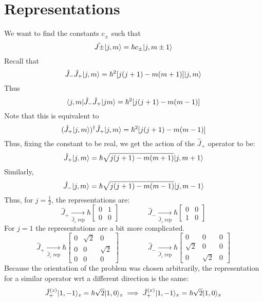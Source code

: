 \section{Representations}
We want to find the constants \(c_\pm\) such that
\[\hat{J\pm} \lvert j,m\rangle=\hbar c_\pm\lvert j,m\pm1\rangle\]
Recall that 
\[\hat J_-\hat J_+ \lvert j,m\rangle= \hbar^2 [j(j+1)-m(m+1)]\lvert j,m\rangle\]
Thus
\[\langle j,m\rvert\hat{J}_-\hat J_+\lvert jm\rangle=\hbar^2[j(j+1)-m(m-1)]\]
Note that this is equivalent to
\[(\hat J_+\lvert j,m\rangle)^{\dagger}\hat{J}_+\lvert j,m\rangle=\hbar^2[j(j+1)-m(m-1)]\]
Thus, fixing the constant to be real, we get the action of the \(\hat{J}_+\) operator to be:
\begin{equation}
	\hat{J}_+\lvert j,m\rangle = \hbar\sqrt{j(j+1)-m(m+1)}\lvert j,m+1\rangle
\end{equation}
Similarly,
\begin{equation}
	\hat{J}_-\lvert j,m\rangle = \hbar\sqrt{j(j+1)-m(m-1)}\lvert j,m-1\rangle
\end{equation}
Thus, for \(j=\frac{1}{2}\), the representations are:
\begin{equation}
	\hat J_+ \xrightarrow[\hat{J}_z\text{\ rep}]{}\hbar\begin{bmatrix}0&1\\0&0\end{bmatrix}
	\qquad\qquad
	\hat J_- \xrightarrow[\hat{J}_z\text{\ rep}]{}\hbar\begin{bmatrix}0&0\\1&0\end{bmatrix}
\end{equation}
For \(j=1\) the representations are a bit more complicated. 
\begin{equation}
	\hat J_+ \xrightarrow[\hat{J}_z\text{\ rep}]{}\hbar\begin{bmatrix}0&\sqrt{2} & 0\\0&0&\sqrt{2}\\0&0&0\end{bmatrix}
	\qquad\qquad
	\hat J_- \xrightarrow[\hat{J}_z\text{\ rep}]{}\hbar\begin{bmatrix}0&0&0\\\sqrt{2}&0&0\\0&\sqrt{2}&0\end{bmatrix}
\end{equation}
Because the orientation of the problem was chosen arbitrarily, the representation for a similar operator wrt a different direction is the same:
\[\hat{J}_+^{(z)}\lvert1,-1\rangle_z = \hbar\sqrt{2}\lvert1,0\rangle_z\implies\hat{J}_+^{(x)}\lvert1,-1\rangle_x = \hbar\sqrt{2}\lvert1,0\rangle_x\]

